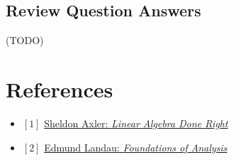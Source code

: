\documentclass[12pt, letterpaper, oneside]{book}
\begin{document}
\section{Review Question Answers}

(TODO)

\chapter*{References}

\begin{itemize}
  \item $[1]$ \href{https://linear.axler.net/}{Sheldon Axler: \it{Linear Algebra Done Right}}
  \item $[2]$ \href{https://bookstore.ams.org/view?ProductCode=CHEL/79}{Edmund Landau: \it{Foundations of Analysis}}
\end{itemize}
\end{document}
